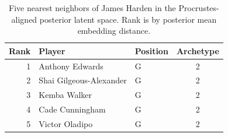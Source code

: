 \begin{table}[htbp]
  \centering\small
  \begin{tabular}{rllc}
    \toprule
    Rank & Player & Position & Archetype \\
    \midrule
    1 & Anthony Edwards & G & 2 \\
    2 & Shai Gilgeous-Alexander & G & 2 \\
    3 & Kemba Walker & G & 2 \\
    4 & Cade Cunningham & G & 2 \\
    5 & Victor Oladipo & G & 2 \\
    \bottomrule
  \end{tabular}
  \caption{Five nearest neighbors of James Harden in the Procrustes-aligned posterior latent space. Rank is by posterior mean embedding distance.}
  \label{tab:James_Harden_neighbors}
\end{table}

